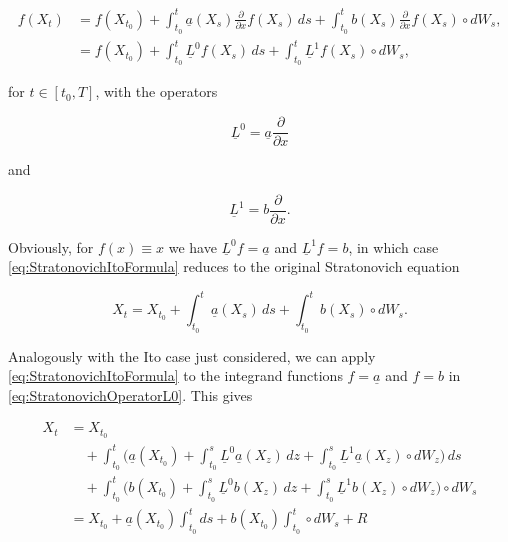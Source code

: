 \begin{equation} \label{eq:StratonovichItoFormula}
\begin{split}
    f(X_t) &= f(X_{t_0}) + \int_{t_0}^t \underline{a}(X_s)\frac{\partial}{\partial x}f(X_s) \, ds+ \int_{t_0}^t b(X_s)\frac{\partial}{\partial x}f(X_s) \circ dW_s, \\
    &= f(X_{t_0}) + \int_{t_0}^t \underline{L}^0 f(X_s) \, ds + \int_{t_0}^t \underline{L}^1 f(X_s) \circ dW_s,
\end{split}
\end{equation}

\noindent for $t \in [t_0, T]$, with the operators

\begin{equation} \label{eq:StratonovichOperatorL0}
    \underline{L}^0 = \underline{a} \frac{\partial}{\partial x}
\end{equation}

\noindent and

\begin{equation} \label{eq:StratonovichOperatorL1}
    \underline{L}^1 = b \frac{\partial}{\partial x}.
\end{equation}

\noindent Obviously, for $f(x) \equiv x$ we have $\underline{L}^0 f = \underline{a}$ and $\underline{L}^1 f = b$, in which case \eqref{eq:StratonovichItoFormula} reduces to the original Stratonovich equation

\begin{equation} \label{eq:StratonovichIdentity}
    X_t = X_{t_0} + \int_{t_0}^t \underline{a}(X_s) \, ds + \int_{t_0}^t b(X_s) \circ dW_s.
\end{equation}

\noindent Analogously with the Ito case just considered, we can apply \eqref{eq:StratonovichItoFormula} to the integrand functions $f = \underline{a}$ and $f = b$ in \eqref{eq:StratonovichOperatorL0}. This gives

\begin{equation} \label{eq:StratonovichCoefficientExpansion}
\begin{split}
    X_t &= X_{t_0} \\
    &\quad + \int_{t_0}^t \biggl( \underline{a}(X_{t_0}) + \int_{t_0}^s \underline{L}^0 \underline{a}(X_z) \, dz + \int_{t_0}^s \underline{L}^1 \underline{a}(X_z) \circ dW_z \biggr) \, ds \\
    &\quad + \int_{t_0}^t \biggl( b(X_{t_0}) + \int_{t_0}^s \underline{L}^0 b(X_z) \, dz + \int_{t_0}^s \underline{L}^1 b(X_z) \circ dW_z \biggr) \circ dW_s \\
    &= X_{t_0} + \underline{a}(X_{t_0}) \int_{t_0}^t ds + b(X_{t_0}) \int_{t_0}^t \circ dW_s + R
\end{split}
\end{equation}


